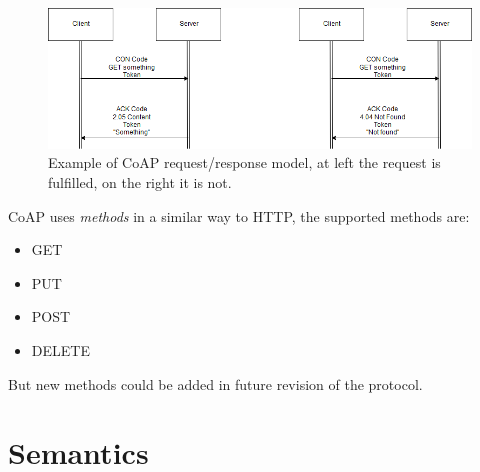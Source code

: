 	\begin{figure}
		\includegraphics[width=\linewidth]{coap-img0.png}
		\caption{Example of CoAP request/response model, at left the request is fulfilled, on the right it is not.}
		\label{fig:coap0}
	\end{figure}
	
	CoAP uses \emph{methods} in a similar way to HTTP, the supported methods are: \newline
	\begin{itemize}
		\item GET
		\item PUT
		\item POST
		\item DELETE
	\end{itemize}
	But new methods could be added in future revision of the protocol.\newline
	
	\section{Semantics}
	
